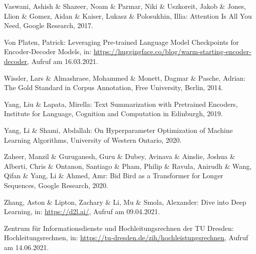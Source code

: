 \begin{thebibliography}{104}
Vaswani, Ashish \& Shazeer, Noam \& Parmar, Niki \& Uszkoreit, Jakob \& Jones, Llion \& Gomez, Aidan \& Kaiser, Lukasz \& Polosukhin, Illia: Attention Is All You Need, Google Research, 2017.

Von Platen, Patrick: Leveraging Pre-trained Language Model Checkpoints for Encoder-Decoder Models, in: \url{https://huggingface.co/blog/warm-starting-encoder-decoder}, Aufruf am 16.03.2021.

Wissler, Lars \& Almashraee, Mohammed \& Monett, Dagmar \& Pasche, Adrian: The Gold Standard in Corpus Annotation, Free University, Berlin, 2014.

Yang, Liu \& Lapata, Mirella: Text Summarization with Pretrained Encoders, Institute for Language, Cognition and Computation in Edinburgh, 2019.

Yang, Li \& Shami, Abdallah: On Hyperparameter Optimization of Machine Learning Algorithms, University of Western Ontario, 2020.

Zaheer, Manzil \& Guruganesh, Guru \& Dubey, Avinava \& Ainslie, Joshua \& Alberti, Chris \& Ontanon, Santiago \& Pham, Philip \& Ravula, Anirudh \& Wang, Qifan \& Yang, Li \& Ahmed, Amr: Bid Bird as a Transformer for Longer Sequences, Google Research, 2020.

Zhang, Aston \& Lipton, Zachary \& Li, Mu \& Smola, Alexander: Dive into Deep Learning, in: \url{https://d2l.ai/}, Aufruf am 09.04.2021.

Zentrum für Informationsdienste und Hochleitungsrechnen der TU Dresden: Hochleitungsrechnen, in: \url{https://tu-dresden.de/zih/hochleistungsrechnen}, Aufruf am 14.06.2021.

\end{thebibliography}
